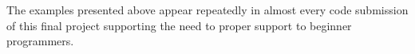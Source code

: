 The examples presented above appear repeatedly in almost every code submission of this final project supporting the need to
proper support to beginner programmers.

